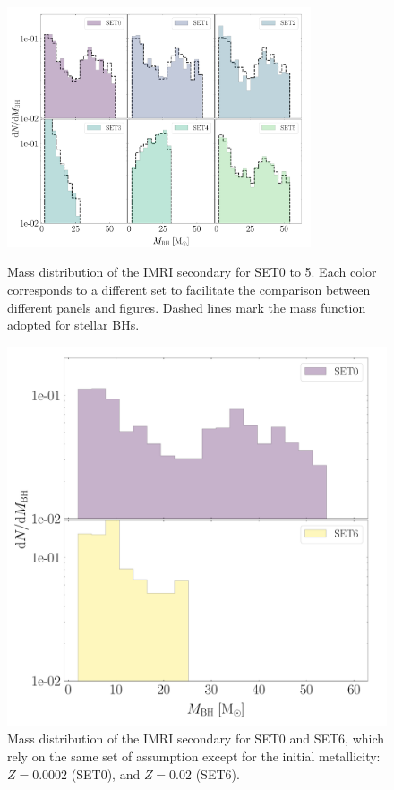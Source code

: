 \documentclass[article]{aa}
\begin{document}
{\begin{figure}
\centering
\includegraphics[width=0.8\textwidth]{massdis}\\
    \caption{%
    Mass distribution of the IMRI secondary for SET0 to 5. Each color corresponds to a different set to facilitate the comparison between different panels and figures. 
    Dashed lines mark the mass function adopted for stellar BHs.
    }
	\label{fig:f8}
\end{figure}

\begin{figure}
\includegraphics[width=\columnwidth]{massdis06}
    \caption{Mass distribution of the IMRI secondary for SET0 and SET6, which rely on the same set of assumption except for the initial metallicity: $Z = 0.0002$ (SET0), and $Z = 0.02$ (SET6).}
	\label{fig:mbhdist}
\end{figure}


}
\end{document}
